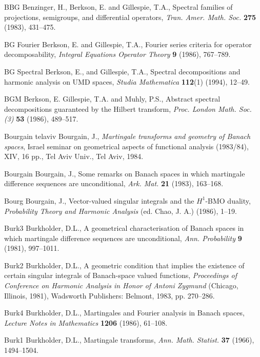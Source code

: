 \documentclass[honours,12pt]{unswthesis}
\numberwithin{equation}{section}
\begin{document}
\begin{thebibliography}{999}

\bibitem
{BBG} Benzinger, H., Berkson, E. and Gillespie, T.A.,
Spectral families of projections, semigroups, and differential operators,
\textit{Tran. Amer. Math. Soc.} \textbf{275} (1983), 431--475.

\bibitem
{BG Fourier} Berkson, E. and Gillespie, T.A.,
Fourier series criteria for operator decomposability,
\textit{Integral Equations Operator Theory} \textbf{9} (1986), 767--789.

\bibitem
{BG Spectral} Berkson, E., and Gillespie, T.A.,
Spectral decompositions and harmonic analysis on UMD spaces,
\textit{Studia Mathematica} \textbf{112}(1) (1994), 12--49.

\bibitem
{BGM} Berkson, E. Gillespie, T.A. and Muhly, P.S.,
Abstract spectral decompositions guaranteed by the Hilbert transform,
\textit{Proc. London Math. Soc. (3)} \textbf{53} (1986), 489--517.

\bibitem
{Bourgain telaviv} 
Bourgain, J., {\em Martingale transforms and geometry of Banach spaces},
Israel seminar on geometrical aspects of functional analysis
(1983/84), XIV, 16 pp., Tel Aviv Univ., Tel Aviv, 1984.

\bibitem
{Bourgain} Bourgain, J.,
Some remarks on Banach spaces in which martingale difference sequences are
unconditional,
\textit{Ark. Mat.} \textbf{21} (1983), 163--168.

\bibitem
{Bourg} Bourgain, J.,
Vector-valued singular integrals and the $H^1$-BMO duality,
\textit{Probability Theory and Harmonic Analysis} (ed. Chao, J. A.) (1986), 
1--19.

\bibitem
{Burk3} Burkholder, D.L.,
A geometrical characterisation of Banach spaces in which martingale difference
sequences are unconditional,
\textit{Ann. Probability} \textbf{9} (1981), 997--1011.

\bibitem
{Burk2} Burkholder, D.L.,
A geometric condition that implies the existence of certain singular integrals
of Banach-space valued functions,
\textit{Proceedings of Conference on Harmonic Analysis in Honor of Antoni
Zygmund} (Chicago, Illinois, 1981), Wadsworth Publishers: Belmont,
1983, pp. 270--286.

\bibitem
{Burk4} Burkholder, D.L.,
Martingales and Fourier analysis in Banach spaces,
\textit{Lecture Notes in Mathematics} \textbf{1206} (1986), 61--108.

\bibitem
{Burk1} Burkholder, D.L.,
Martingale transforms,
\textit{Ann. Math. Statist.} \textbf{37} (1966), 1494--1504.


\end{thebibliography}
\end{document}
